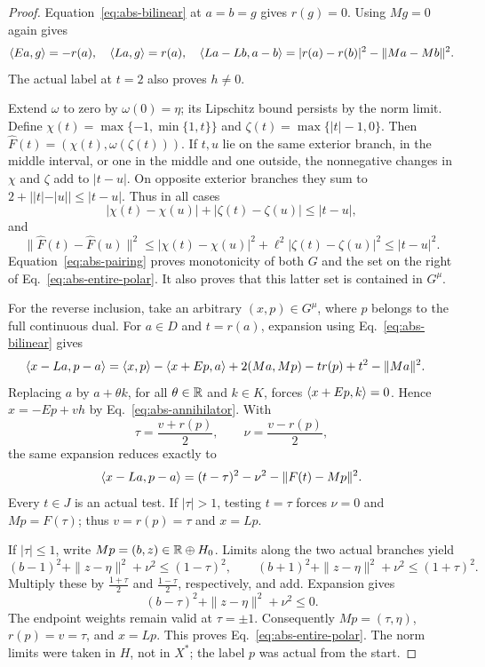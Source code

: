 \begin{proof}
Equation~\eqref{eq:abs-bilinear} at $a=b=g$ gives $r(g)=0$.
Using $Mg=0$ again gives
\begin{equation}
\langle Ea,g\rangle=-r(a),\quad \langle La,g\rangle=r(a),\quad
\langle La-Lb,a-b\rangle=|r(a)-r(b)|^2-\|Ma-Mb\|^2.
\label{eq:abs-pairing}
\end{equation}
The actual label at $t=2$ also proves $h\ne0$.

Extend $\omega$ to zero by $\omega(0)=\eta$; its Lipschitz bound
persists by the norm limit. Define
$\chi(t)=\max\{-1,\min\{1,t\}\}$ and
$\zeta(t)=\max\{|t|-1,0\}$. Then
$\widehat F(t)=(\chi(t),\omega(\zeta(t)))$.
If $t,u$ lie on the same exterior branch, in the middle interval,
or one in the middle and one outside, the nonnegative changes in
$\chi$ and $\zeta$ add to $|t-u|$. On opposite exterior branches
they sum to $2+||t|-|u||\le|t-u|$. Thus in all cases
\[
|\chi(t)-\chi(u)|+|\zeta(t)-\zeta(u)|\le|t-u|,
\]
and
\[
\|\widehat F(t)-\widehat F(u)\|^2
\le|\chi(t)-\chi(u)|^2+\ell^2|\zeta(t)-\zeta(u)|^2
\le|t-u|^2.
\]
Equation~\eqref{eq:abs-pairing} proves monotonicity of both $G$
and the set on the right of Eq.~\eqref{eq:abs-entire-polar}.
It also proves that this latter set is contained in $G^\mu$.

For the reverse inclusion, take an arbitrary $(x,p)\in G^\mu$,
where $p$ belongs to the full continuous dual. For $a\in D$ and
$t=r(a)$, expansion using Eq.~\eqref{eq:abs-bilinear} gives
\begin{align*}
\langle x-La,p-a\rangle
={}&\langle x,p\rangle-\langle x+Ep,a\rangle
       +2(Ma,Mp)-t r(p)+t^2-\|Ma\|^2.
\end{align*}
Replacing $a$ by $a+\theta k$, for all $\theta\in\mathbb R$ and
$k\in K$, forces $\langle x+Ep,k\rangle=0$. Hence
$x=-Ep+v h$ by Eq.~\eqref{eq:abs-annihilator}. With
\[
\tau=\frac{v+r(p)}2,\qquad \nu=\frac{v-r(p)}2,
\]
the same expansion reduces exactly to
\begin{equation}
\langle x-La,p-a\rangle=(t-\tau)^2-\nu^2-\|F(t)-Mp\|^2.
\label{eq:abs-polar-square}
\end{equation}
Every $t\in J$ is an actual test. If $|\tau|>1$, testing
$t=\tau$ forces $\nu=0$ and $Mp=F(\tau)$; thus
$v=r(p)=\tau$ and $x=Lp$.

If $|\tau|\le1$, write $Mp=(b,z)\in\mathbb R\oplus H_0$.
Limits along the two actual branches yield
\[
(b-1)^2+\|z-\eta\|^2+\nu^2\le(1-\tau)^2,
\qquad
(b+1)^2+\|z-\eta\|^2+\nu^2\le(1+\tau)^2.
\]
Multiply these by $\frac{1+\tau}{2}$ and $\frac{1-\tau}{2}$, respectively,
and add. Expansion gives
\[
(b-\tau)^2+\|z-\eta\|^2+\nu^2\le0.
\]
The endpoint weights remain valid at $\tau=\pm1$.
Consequently $Mp=(\tau,\eta)$, $r(p)=v=\tau$, and $x=Lp$.
This proves Eq.~\eqref{eq:abs-entire-polar}. The norm limits were
taken in $H$, not in $X^*$; the label $p$ was actual from the start.


\end{proof}
